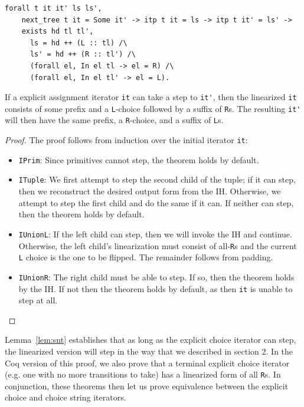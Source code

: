 \documentclass[a4paper,english]{lipics-v2019}
\renewcommand{\L}{{\tt L}\xspace}
\newcommand{\Ls}{{\tt L}s\xspace}
\newcommand{\R}{{\tt R}\xspace}
\newcommand{\Rs}{{\tt R}s\xspace}
\begin{document}
\begin{lemma}
\label{lem:snt}
\begin{small}\begin{verbatim}
forall t it it' ls ls',
    next_tree t it = Some it' -> itp t it = ls -> itp t it' = ls' ->
    exists hd tl tl',
      ls = hd ++ (L :: tl) /\
      ls' = hd ++ (R :: tl') /\
      (forall el, In el tl -> el = R) /\
      (forall el, In el tl' -> el = L).
\end{verbatim}\end{small}
If a explicit assignment iterator \verb|it| can take a step to \verb|it'|, then
the linearized \verb|it| consists of some prefix and a \L-choice followed by a suffix of \Rs.
The resulting \verb|it'| will then have the same prefix, a \R-choice, and a suffix of \Ls.
\end{lemma}
\begin{proof}
The proof follows from induction over the initial iterator \verb|it|:
\begin{itemize}
    \item \verb|IPrim|: Since primitives cannot step, the theorem holds by default.
    \item \verb|ITuple|: We first attempt to step the second child of the tuple; if it can step, then 
    we reconstruct the desired output form from the IH. Otherwise, we attempt to step the first child and
    do the same if it can. If neither can step, then the theorem holds by default.
    \item \verb|IUnionL|: If the left child can step, then we will invoke the IH and continue. Otherwise,
    the left child's linearization must consist of all-\Rs and the current \L choice is the one to be flipped. 
    The remainder follows from padding.
    \item \verb|IUnionR|: The right child must be able to step. If so, then the theorem holds by the IH.
    If not then the theorem holds by default, as then \verb|it| is unable to step at all.
\end{itemize}
\end{proof}

Lemma~\ref{lem:snt} establishes that as long as the explicit choice iterator can step, the linearized
version will step in the way that we described in section 2. In the Coq version of this proof, we also
prove that a terminal explicit choice iterator (e.g. one with no more transitions to take) has a linearized
form of all \Rs. In conjunction, these theorems then let us prove equivalence between the explicit choice and
choice string iterators.
\end{document}
